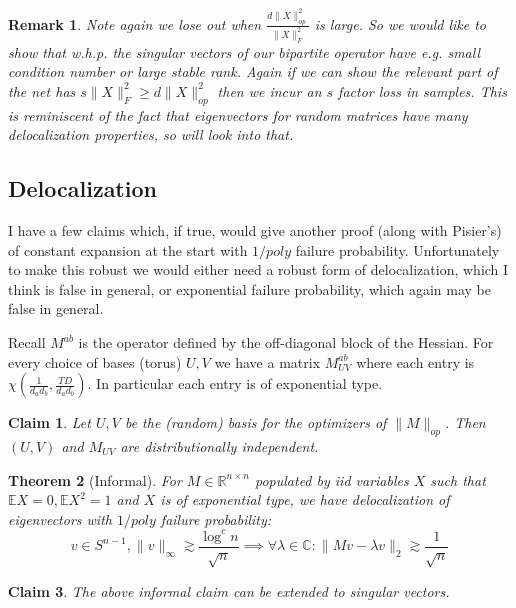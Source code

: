 \documentclass{article}
\newtheorem{theorem}{Theorem}
\newtheorem{claim}[theorem]{Claim}
\newtheorem{remark}{Remark}
\newcommand{\R}{{\mathbb{R}}}
\newcommand{\C}{{\mathbb{C}}}
\newcommand{\E}{\mathbb{E}}
\begin{document}
\begin{remark}
Note again we lose out when $\frac{d \|X\|_{op}^{2}}{\|X\|_{F}^{2}}$ is large. So we would like to show that w.h.p. the singular vectors of our bipartite operator have e.g. small condition number or large stable rank. Again if we can show the relevant part of the net has $s \|X\|_{F}^{2} \geq d \|X\|_{op}^{2}$ then we incur an $s$ factor loss in samples. This is reminiscent of the fact that eigenvectors for random matrices have many delocalization properties, so will look into that.
\end{remark}

\subsection{Delocalization}
I have a few claims which, if true, would give another proof (along with Pisier's) of constant expansion at the start with $1/poly$ failure probability. Unfortunately to make this robust we would either need a robust form of delocalization, which I think is false in general, or exponential failure probability, which again may be false in general.

Recall $M^{ab}$ is the operator defined by the off-diagonal block of the Hessian. For every choice of bases (torus) $U,V$ we have a matrix $M^{ab}_{UV}$ where each entry is $\chi(\frac{1}{d_{a}d_{b}}, \frac{TD}{d_{a}d_{b}})$. In particular each entry is of exponential type.

\begin{claim}
Let $U,V$ be the (random) basis for the optimizers of $\|M\|_{op}$. Then $(U,V)$ and $M_{UV}$ are distributionally independent.
\end{claim}

\begin{theorem} [Informal]
For $M \in \R^{n \times n}$ populated by iid variables $X$ such that $\E X = 0, \E X^{2} = 1$ and $X$ is of exponential type, we have delocalization of eigenvectors with $1/poly$ failure probability:
\[ v \in S^{n-1}, \|v\|_{\infty} \gtrsim \frac{\log^{c} n}{\sqrt{n}} \implies \forall \lambda \in \C: \|Mv - \lambda v\|_{2} \gtrsim \frac{1}{\sqrt{n}}   \]
\end{theorem}


\begin{claim}
The above informal claim can be extended to singular vectors.
\end{claim}
\end{document}
